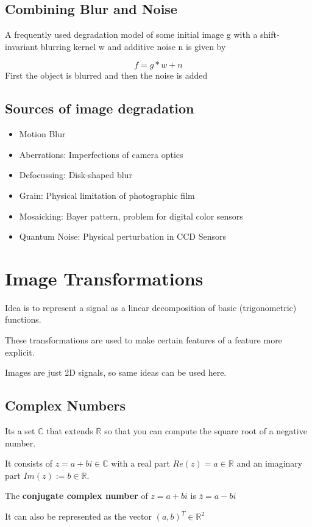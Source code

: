\documentclass{article}
\begin{document}
\subsection{Combining Blur and Noise}
A frequently used degradation model of some initial image g with a shift-invariant blurring kernel w and
additive noise n is given by

\[f = g\ast w + n\]
First the object is blurred and then the noise is added

\subsection{Sources of image degradation}
\begin{itemize}
  \item Motion Blur
  \item Aberrations: Imperfections of camera optics
  \item Defocussing: Disk-shaped blur 
  \item Grain: Physical limitation of photographic film
  \item Mosaicking: Bayer pattern, problem for digital color sensors
  \item Quantum Noise: Physical perturbation in CCD Sensors
\end{itemize}
\section{Image Transformations}
Idea is to represent a signal as a linear decomposition of basic (trigonometric) functions.

These transformations are used to make certain features of a feature more explicit.

Images are just 2D signals, so same ideas can be used here.

\subsection{Complex Numbers}
Its a set $\mathbb{C}$ that extends $\mathbb{R}$ so that you can compute the square root of a negative number.

It consists of $z = a+bi \in \mathbb{C}$ with a real part $Re(z) = a \in \mathbb{R}$ and an imaginary part $Im(z) := b \in \mathbb{R}$.

The \textbf{conjugate complex number} of $z = a+bi$ is $ \overline{z} = a-bi$

It can also be represented as the vector $(a,b)^T \in \mathbb{R} ^2$
\end{document}
